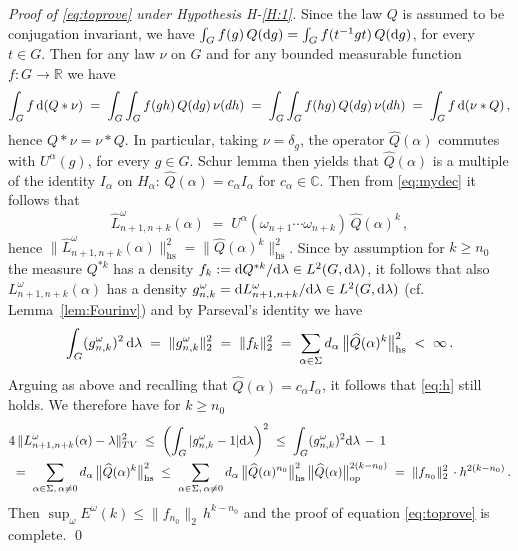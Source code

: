 \documentclass[a4paper,reqno,11pt]{amsart}
\numberwithin{equation}{section}
\newcommand{\ga}{\alpha}
\newcommand{\gd}{\delta}
\newcommand{\gl}{\lambda}
\newcommand{\go}{\omega}
\newcommand{\dd}{\text{\rm d}}             %
\newcommand{\R}{\mathbb{R}}
\newcommand{\C}{\mathbb{C}}
\newcommand{\somb}{\widehat} %
\begin{document}
\noindent
{\it Proof of \eqref{eq:toprove} under
Hypothesis H-\ref{H:1}.} 
Since the law $Q$ is assumed to be conjugation invariant, we have
$\int_G f(g) \, Q(\dd g) = \int_G f(t^{-1} g t) \, Q(\dd g)$, 
for every $t \in G$. Then for any law
$\nu$ on $G$ and for any bounded measurable function $f:G \to \R$ we have
\begin{equation}
\int_G f \, \dd (Q*\nu) \;=\; \int_G \int_G f(gh) \, Q(dg) \, \nu(dh) \;=\; \int_G \int_G
f(hg) \, Q(dg) \, \nu(dh) \;=\; \int_G f \, \dd (\nu*Q) \,,
\end{equation}
hence $Q * \nu = \nu * Q$. In particular, taking $\nu = \gd_g$,
the operator $\somb Q(\alpha)$ commutes with $U^\alpha(g)$, for every $g\in G$.
Schur lemma then yields that $\somb Q(\alpha)$ is a
multiple of the identity $I_\alpha$ on $H_\alpha$: $\somb Q(\alpha) =
c_\alpha I_\alpha$ for $c_\ga \in \C$.
Then from \eqref{eq:mydec} it follows that
\begin{equation}
\somb L^\go_{n+1,n+k}(\alpha)  \;=\;
U^\alpha(\go_{n+1} \cdots \go_{n+k}) \,
\somb Q(\alpha)^{k} \,,
\end{equation}
hence $\|\somb L^\go_{n+1,n+k}(\alpha)\|^2_{\mathrm{hs}}
= \|\somb Q(\alpha)^{k} \|^{2}_{\mathrm{hs}}$.
Since by assumption for $k \ge n_0$ the measure $Q^{*k}$ has a density
$f_k := \dd Q^{*k} / \dd \gl \in L^2(G,\dd \gl)$, 
it follows that also $L^\go_{n+1,n+k}(\alpha)$
has a density $g^\go_{n,k} = \dd L^\go_{n+1,n+k} / \dd \gl \in L^2(G,\dd \gl)$
(cf. Lemma~\ref{lem:Fourinv})
and by Parseval's identity we have
\begin{equation*}
	\int_G (g^\go_{n,k})^2 \, \dd \gl \;=\;
	\| g^\go_{n,k} \|_2^2 \;=\; \| f_k \|_2^2
	\;=\; \sum_{\ga \in \Sigma}
	d_\ga \, \big\| \somb{Q}(\ga)^k \big\|_{\text{hs}}^2 \;<\; \infty \,.
\end{equation*}
Arguing as above and recalling that $\somb Q(\ga) = c_\ga I_\ga$,
it follows that \eqref{eq:h} still holds.
We therefore have for $k \ge n_0$
\begin{equation}
\begin{split}
 & 4\, \|L^\go_{n+1,n+k}(\alpha) - \lambda\|^2_{TV} 
\;\le\; \left( \int_G |g^\go_{n,k} - 1| \dd \gl \right)^2
\;\le\; \int_G (g^\go_{n,k})^2 \dd \gl \,-\, 1 \\
& \;=\; \sum_{\alpha \in \Sigma, \, \ga \ne 0}
d_{\alpha} \, \big\|\somb Q(\alpha)^{k} \big\|^{2}_{\mathrm{hs}}
\;\le\; \sum_{\alpha \in \Sigma, \, \ga \ne 0}
d_{\alpha} \, \big\| \somb Q(\alpha)^{n_0} \big\|^{2}_{\mathrm{hs}} \,
\big\| \somb Q(\alpha) \big\|^{2 (k-n_0)}_{\mathrm{op}}  \;=\; \| f_{n_0} \|_2^2 \,  \cdot 
h^{2 (k-n_0)} \,.
\end{split}
\end{equation}
Then $\sup_\go E^\go(k) \le \| f_{n_0} \|_2 \, 
h^{k-n_0}$ and the proof
of equation \eqref{eq:toprove} is complete.
\qed
\end{document}
